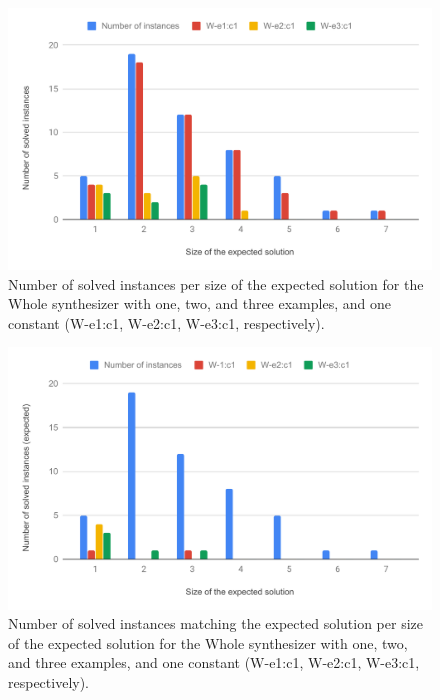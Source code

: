 \begin{figure}
  \centering
  \includegraphics[width=1.0\textwidth]{assets/bar-chart-solved-whole.pdf}
  \caption{Number of solved instances per size of the expected solution for
    the Whole synthesizer with one, two, and three examples, and one constant
    (W-e1:c1, W-e2:c1, W-e3:c1, respectively).}
  \label{fig:bar-chart-solved-whole}
\end{figure}

\begin{figure}
  \centering
  \includegraphics[width=1.0\textwidth]{assets/bar-chart-expected-whole.pdf}
  \caption{Number of solved instances matching the expected solution per size of
    the expected solution for the Whole synthesizer with one, two, and three
    examples, and one constant (W-e1:c1, W-e2:c1, W-e3:c1, respectively).}
  \label{fig:bar-chart-expected-whole}
\end{figure}

